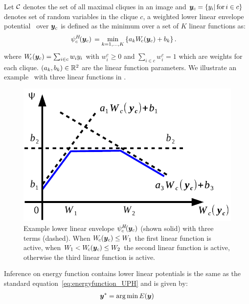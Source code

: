 Let ${\mathcal{C}}$ denotes the set of all maximal cliques in an image and
${\bm{y}}_c=\{y_i |\text{\,for\,} i \in c\}$ denotes set of random
variables in the clique $c$, a weighted lower linear envelope
potential~\cite{gouldlearning} over ${\bm{y}}_c$ is defined as the
minimum over a set of $K$ linear functions as:
%
\begin{align}
  \psi^H_c\!({\bm{y}}_c) \, &= \min_{k=1, \ldots, K} \left\{ a_k W_{\!c}({\bm{y}}_c) + b_k \right\}.
  \label{eqn:potential2}
\end{align}
%
where $W_{\!c}({\bm{y}}_c) = \sum_{i \in c} w_i y_i$ with $w^c_i \geq
0$ and $\sum_{i \in c} w^c_i = 1$ which are weights for each
clique. $(a_k, b_k) \in {\mathbb{R}}^2$ are the linear function
parameters. We illustrate an example~\cite{gouldlearning} with
three linear functions in .
%
\begin{figure}[ht]
  \centering
  \includegraphics[width=0.6\columnwidth]{Methodology/figures/not_redundant}
  \caption{\label{fig:nonredundant} Example lower linear envelope
    $\psi^H_c\!({\bm{y}}_c)$ (shown solid) with three terms (dashed).
    When $W_{\!c}({\bm{y}}_c) \leq W_1$ the first linear function is
    active, when $W_1 < W_{\!c}({\bm{y}}_c) \leq W_2$ the second
    linear function is active, otherwise the third linear
    function is active.}
\end{figure}

Inference on energy function contains lower linear potentials is
the same as the standard equation~\eqref{eq:energyfunction_UPH}
and is given by:
\begin{align}
  \label{eq:min_energy}
  {\bm{y}}^* = \operatorname*{arg\,min}E\!\left({\bm{y}}\right)
\end{align}

